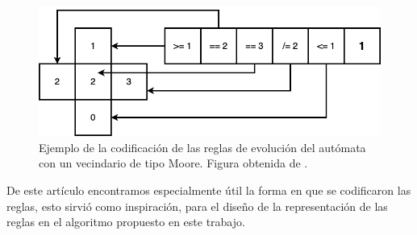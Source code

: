 \begin{figure}[H]
	\centering
	\includegraphics[width=\linewidth]{fig/codreglas}
	\caption{Ejemplo de la codificación de las reglas de evolución del autómata con un vecindario de tipo Moore. Figura obtenida de \cite{bidlo2016routine}.}
	\label{fig:rulesencoding}
\end{figure}

De este artículo \citep{bidlo2016routine} encontramos especialmente útil la forma en que se codificaron las reglas, esto sirvió como inspiración, para el diseño de la representación de las reglas en el algoritmo propuesto en este trabajo.

